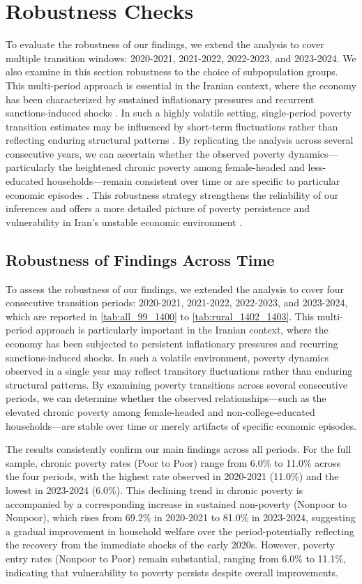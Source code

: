 \documentclass[12pt,a4paper]{article}
\begin{document}
\section{Robustness Checks} 
To evaluate the robustness of our findings, we extend the analysis to cover multiple transition windows: 2020-2021, 2021-2022, 2022-2023, and 2023-2024. We also examine in this section robustness to the choice of subpopulation groups. This multi-period approach is essential in the Iranian context, where the economy has been characterized by sustained inflationary pressures and recurrent sanctions-induced shocks \citep{WorldBank2023, EslamiHoseini2024}. In such a highly volatile setting, single-period poverty transition estimates may be influenced by short-term fluctuations rather than reflecting enduring structural patterns \citep{BaulchHoddinott2000}. By replicating the analysis across several consecutive years, we can ascertain whether the observed poverty dynamics—particularly the heightened chronic poverty among female-headed and less-educated households—remain consistent over time or are specific to particular economic episodes \citep{BarrettCarter2016}. This robustness strategy strengthens the reliability of our inferences and offers a more detailed picture of poverty persistence and vulnerability in Iran's unstable economic environment \citep{Ravallion2001, Dercon2005}.
\subsection{Robustness of Findings Across Time}

To assess the robustness of our findings, we extended the analysis to cover four consecutive transition periods: 2020-2021, 2021-2022, 2022-2023, and 2023-2024, which are reported in  \autoref{tab:all_99_1400}  to  \autoref{tab:rural_1402_1403}. This multi-period approach is particularly important in the Iranian context, where the economy has been subjected to persistent inflationary pressures and recurring sanctions-induced shocks. In such a volatile environment, poverty dynamics observed in a single year may reflect transitory fluctuations rather than enduring structural patterns. By examining poverty transitions across several consecutive periods, we can determine whether the observed relationships—such as the elevated chronic poverty among female-headed and non-college-educated households—are stable over time or merely artifacts of specific economic episodes.

The results consistently confirm our main findings across all periods. For the full sample, chronic poverty rates (Poor to Poor) range from 6.0\% to 11.0\% across the four periods, with the highest rate observed in 2020-2021 (11.0\%) and the lowest in 2023-2024 (6.0\%). This declining trend in chronic poverty is accompanied by a corresponding increase in sustained non-poverty (Nonpoor to Nonpoor), which rises from 69.2\% in 2020-2021 to 81.0\% in 2023-2024, suggesting a gradual improvement in household welfare over the period-potentially reflecting the recovery from the immediate shocks of the early 2020s. However, poverty entry rates (Nonpoor to Poor) remain substantial, ranging from 6.0\% to 11.1\%, indicating that vulnerability to poverty persists despite overall improvements.
\end{document}
